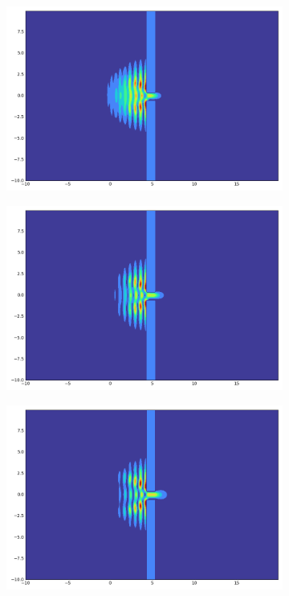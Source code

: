 \begin{figure}[h]
\begin{subfigure}{0.3\linewidth}
    \end{subfigure}
    \begin{subfigure}{0.3\linewidth}
        \includegraphics[width=\linewidth]{5/300}
    \end{subfigure}
    \begin{subfigure}{0.3\linewidth}
        \includegraphics[width=\linewidth]{5/400}
    \end{subfigure}
    \begin{subfigure}{0.3\linewidth}
        \includegraphics[width=\linewidth]{5/500}

\end{subfigure}
\end{figure}
